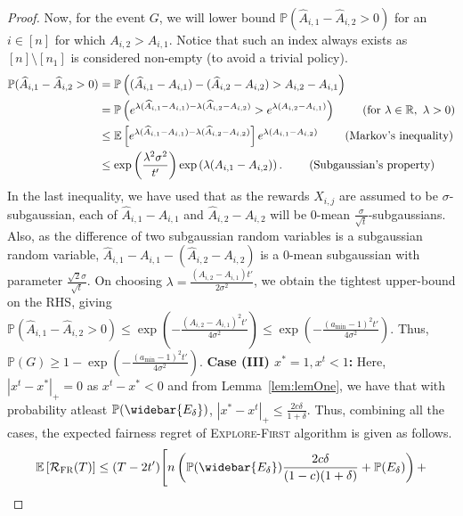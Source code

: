 \begin{proof}
Now, for the event $G$, we will lower bound $\mathbb{P}(\widehat{A}_{i,1}-\widehat{A}_{i,2}> 0)$ for an $i\in [n]$ for which $A_{i,2}> A_{i,1}$. Notice that such an index always exists as $[n]\setminus [n_1]$ is considered non-empty (to avoid a trivial policy).
\begin{align*}
\mathbb{P}(\widehat{A}_{i,1}-\widehat{A}_{i,2}> 0) &= \mathbb{P}\left((\widehat{A}_{i,1}- A_{i,1})-(\widehat{A}_{i,2}-A_{i,2})> A_{i,2}-A_{i,1}\right)\\
&= \mathbb{P}\left(e^{\lambda(\widehat{A}_{i,1}- A_{i,1})-\lambda(\widehat{A}_{i,2}-A_{i,2})}> e^{\lambda(A_{i,2}-A_{i,1})}\right) \ \tag{for $\lambda\in \mathbb{R}, \
\lambda>0$}\\
&\leq \mathbb{E}\left[ e^{\lambda(\widehat{A}_{i,1}- A_{i,1})-\lambda(\widehat{A}_{i,2}-A_{i,2})} \right]e^{\lambda(A_{i,1}-A_{i,2})} \ \tag{Markov's inequality} \\
&\leq \exp\left({\frac{\lambda^2\sigma^2}{t'}}\right) \exp\left({\lambda(A_{i,1}-A_{i,2})}\right). \ \tag{Subgaussian's property}
\end{align*}
In the last inequality, we have used that as the rewards $X_{i, j}$ are assumed to be $\sigma$-subgaussian, each of $\widehat{A}_{i,1}- A_{i,1}$ and $\widehat{A}_{i,2}-A_{i,2}$ will be 0-mean $\frac{\sigma}{\sqrt{t}}$-subgaussians. Also, as the difference of two subgaussian random variables is a subgaussian random variable, $\widehat{A}_{i,1}- A_{i,1}-(\widehat{A}_{i,2}-A_{i,2})$ is a 0-mean subgaussian with parameter $\frac{\sqrt{2}\sigma}{\sqrt{t}}$.
On choosing $\lambda=\frac{(A_{i,2}-A_{i,1})t'}{2\sigma^2}$, we obtain the tightest upper-bound on the RHS, giving $ \mathbb{P}(\widehat{A}_{i,1}-\widehat{A}_{i,2}> 0) \leq \exp\left(-\frac{(A_{i,2}-A_{i,1})^2t'}{4\sigma^2}\right)\leq \exp\left(-\frac{(a_{\min}-1)^2t'}{4\sigma^2}\right).$ Thus, $\mathbb{P}(G)\geq 1-\exp\left(-\frac{(a_{\min}-1)^2t'}{4\sigma^2}\right)$.
\newline
\textbf{Case (III) $x^*=1, x^t<1$:} Here, $|x^t-x^*|_+=0$ as $x^t-x^*<0$ and from Lemma~\ref{lem:lemOne}, we have that with probability atleast $\mathbb{P}(\widebar{E_\delta})$, $|x^*-x^t|_+\leq \frac{2c\delta}{1+\delta}$.
\newline
\newline
Thus, combining all the cases, the expected fairness regret of \textsc{Explore-First} algorithm is given as follows.
\begin{align*}
    \mathbb{E}\left[ \mathcal{R}_{\textsc{FR}}(T) \right]&\leq (T-2t')\Bigg[n\left( \mathbb{P}(\widebar{E_\delta})\frac{2c\delta}{(1-c)(1+\delta)} + \mathbb{P}(E_\delta) \right) +\\

\end{align*}
\end{proof}

